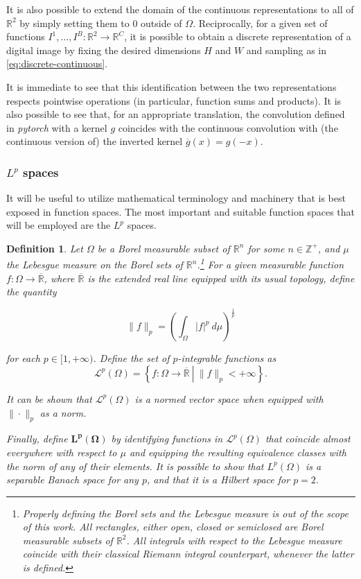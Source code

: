 \documentclass[twocolumn,twoside,a4paper,10pt]{IEEEtran}
\newtheorem{definition}{Definition}
\begin{document}
It is also possible to extend the domain of the continuous representations to all of \(\mathbb{R}^2\) by simply setting them to \(0\) outside of \(\Omega\). Reciprocally, for a given set of functions \(I^1, \dots, I^B\colon \mathbb{R}^2\to \mathbb{R}^C\), it is possible to obtain a discrete representation of a digital image by fixing the desired dimensions \(H\) and \(W\) and sampling as in \cref{eq:discrete-continuous}.

It is immediate to see that this identification between the two representations respects pointwise operations (in particular, function sums and products). It is also possible to see that, for an appropriate translation, the convolution defined in \textit{pytorch} with a kernel \(g\) coincides with the continuous convolution with (the continuous version of) the inverted kernel \(\overline{g}(x) = g(-x)\).

\subsubsection{\(L^p\) spaces}
It will be useful to utilize mathematical terminology and machinery that is best exposed in function spaces. The most important and suitable function spaces that will be employed are the \(L^p\) spaces.

\begin{definition}
  Let \(\Omega\) be a Borel measurable subset of \(\mathbb{R}^n\) for some \(n\in \mathbb{Z}^+\), and \(\mu\) the Lebesgue measure on the Borel sets of \(\mathbb{R}^n\).\footnote{Properly defining the Borel sets and the Lebesgue measure is out of the scope of this work. All rectangles, either open, closed or semiclosed are Borel measurable subsets of \(\mathbb{R}^2\). All integrals with respect to the Lebesgue measure coincide with their classical Riemann integral counterpart, whenever the latter is defined.} For a given measurable function \(f\colon \Omega\to \overline{\mathbb{R}}\), where \(\overline{\mathbb{R}}\) is the extended real line equipped with its usual topology, define the quantity

  \[
    \|f\|_{p} = \left(\int_{\Omega}|f|^p~d\mu\right)^{\frac 1p}
  \]

  for each \(p\in[1, +\infty)\). Define the set of \(p\)-integrable functions as 
  \[
    \mathcal{L}^p(\Omega) = \left\{f\colon\Omega\to \mathbb{\overline{R}}~\left|~\|f\|_{p}<+\infty\right.\right\}
  .\]

  It can be shown that \(\mathcal{L}^p(\Omega)\) is a normed vector space when equipped with \(\|\cdot\|_{p}\) as a norm.

  Finally, define \(\bm{L^p(\Omega)}\) by identifying functions in \(\mathcal{L}^p(\Omega)\) that coincide almost everywhere with respect to \(\mu\) and equipping the resulting equivalence classes with the norm of any of their elements. It is possible to show that \(L^p(\Omega)\) is a separable Banach space for any \(p\), and that it is a Hilbert space for \(p=2\).
\end{definition}
\end{document}
